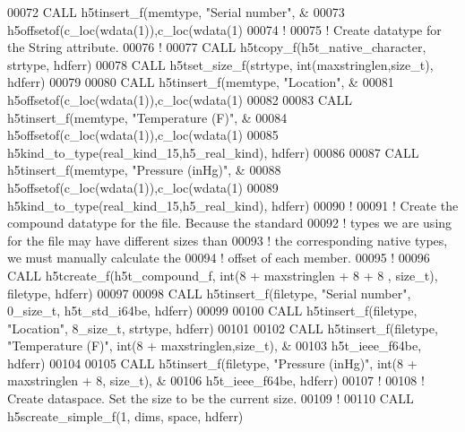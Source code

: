 \begin{DoxyCode}
00072   \textcolor{keyword}{CALL }h5tinsert\_f(memtype, \textcolor{stringliteral}{"Serial number"}, &
00073        h5offsetof(c\_loc(wdata(1)),c\_loc(wdata(1)%
00074   \textcolor{comment}{!}
00075   \textcolor{comment}{! Create datatype for the String attribute.}
00076   \textcolor{comment}{!}
00077   \textcolor{keyword}{CALL }h5tcopy\_f(h5t\_native\_character, strtype, hdferr)
00078   \textcolor{keyword}{CALL }h5tset\_size\_f(strtype, int(maxstringlen,size\_t), hdferr)  
00079 
00080   \textcolor{keyword}{CALL }h5tinsert\_f(memtype, \textcolor{stringliteral}{"Location"}, &
00081        h5offsetof(c\_loc(wdata(1)),c\_loc(wdata(1)%
00082 
00083   \textcolor{keyword}{CALL }h5tinsert\_f(memtype, \textcolor{stringliteral}{"Temperature (F)"}, &
00084        h5offsetof(c\_loc(wdata(1)),c\_loc(wdata(1)%
00085        h5kind\_to\_type(real\_kind\_15,h5\_real\_kind), hdferr)
00086 
00087   \textcolor{keyword}{CALL }h5tinsert\_f(memtype, \textcolor{stringliteral}{"Pressure (inHg)"}, &
00088        h5offsetof(c\_loc(wdata(1)),c\_loc(wdata(1)%
00089        h5kind\_to\_type(real\_kind\_15,h5\_real\_kind), hdferr)
00090   \textcolor{comment}{!}
00091   \textcolor{comment}{! Create the compound datatype for the file.  Because the standard}
00092   \textcolor{comment}{! types we are using for the file may have different sizes than}
00093   \textcolor{comment}{! the corresponding native types, we must manually calculate the}
00094   \textcolor{comment}{! offset of each member.}
00095   \textcolor{comment}{!}
00096   \textcolor{keyword}{CALL }h5tcreate\_f(h5t\_compound\_f, int(8 + maxstringlen + 8 + 8 , size\_t), filetype, hdferr)
00097   
00098   \textcolor{keyword}{CALL }h5tinsert\_f(filetype, \textcolor{stringliteral}{"Serial number"}, 0\_size\_t, h5t\_std\_i64be, hdferr)
00099 
00100   \textcolor{keyword}{CALL }h5tinsert\_f(filetype, \textcolor{stringliteral}{"Location"}, 8\_size\_t, strtype, hdferr)
00101 
00102   \textcolor{keyword}{CALL }h5tinsert\_f(filetype, \textcolor{stringliteral}{"Temperature (F)"}, int(8 + maxstringlen,size\_t), &
00103        h5t\_ieee\_f64be, hdferr)
00104 
00105   \textcolor{keyword}{CALL }h5tinsert\_f(filetype, \textcolor{stringliteral}{"Pressure (inHg)"}, int(8 + maxstringlen + 8, size\_t), &
00106        h5t\_ieee\_f64be, hdferr)
00107   \textcolor{comment}{!}
00108   \textcolor{comment}{! Create dataspace.  Set the size to be the current size.}
00109   \textcolor{comment}{!}
00110   \textcolor{keyword}{CALL }h5screate\_simple\_f(1, dims, space, hdferr)

\end{DoxyCode}
